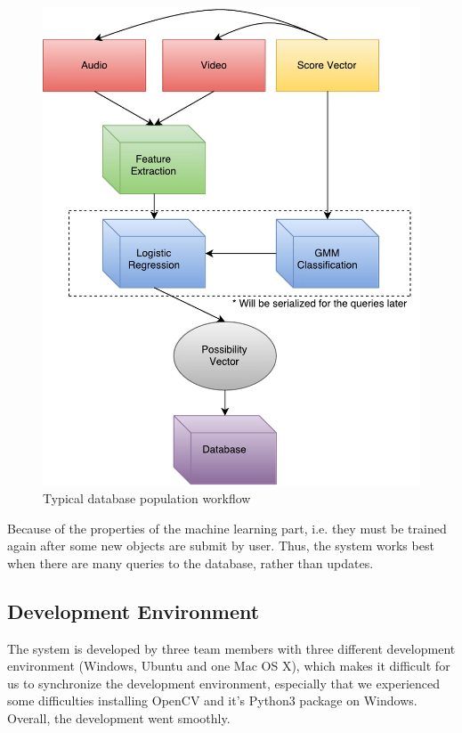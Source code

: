 \documentclass{report}
\begin{document}
\begin{figure}[H]
  \centering
  \includegraphics[scale=0.7]{vdf-pop.pdf}
  \caption{Typical database population workflow}
  \label{fig:pwf}
\end{figure}

Because of the properties of the machine learning part, i.e. they must be trained again after some new objects are submit by user. Thus, the system works best when there are many queries to the database, rather than updates.

\subsection{Development Environment}

The system is developed by three team members with three different development environment (Windows, Ubuntu and one Mac OS X), which makes it difficult for us to synchronize the development environment, especially that we experienced some difficulties installing OpenCV and it’s Python3 package on Windows. Overall, the development went smoothly.
\end{document}
